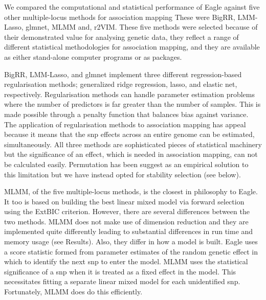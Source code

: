 \documentclass{article}
\begin{document}
We compared the computational and statistical performance of Eagle against five other multiple-locus methods for 
association mapping  These were BigRR, LMM-Lasso, glmnet, MLMM  and, r2VIM. 
These five methods were selected because of their demonstrated value 
for analysing genetic data, they reflect a range of different statistical methodologies for association mapping, and they are available as 
either stand-alone computer programs or as  packages.

BigRR, LMM-Lasso, and glmnet  implement three different regression-based regularisation methods; generalized ridge regression, 
lasso, and elastic net, respectively. Regularisation methods can handle parameter estimation problems where the number of predictors is
 far greater than the number of  samples. This is made possible through a penalty function that balances bias against variance. 
The application of regularisation methods to association mapping has appeal because it means that the snp effects across an 
entire genome can be estimated, simultaneously. 
All three methods are sophisticated pieces of statistical machinery but the significance of an effect, which 
is needed in association mapping,  can not be calculated easily. Permutation has been suggest as an empirical solution to this 
limitation \cite{shen2013novel} 
but we have instead opted for stability selection (see below).

MLMM, of the five multiple-locus methods, is the closest in philosophy to Eagle. It too is based on  building the 
best  linear mixed model via forward selection using the ExtBIC criterion. 
However, there are several differences between the two methods.
 MLMM does not make use of dimension reduction and they are implemented quite differently leading to substantial 
 differences  in run time and memory usage (see Results).  Also, they differ in how a model is built. 
 Eagle uses a score statistic formed from parameter estimates of the random genetic effect in which to identify the next snp to enter 
 the model.  MLMM uses the statistical significance of a snp when it is treated as a fixed effect in the model. 
 This necessitates fitting a separate linear mixed model for each unidentified snp. Fortunately,  MLMM does do this 
 efficiently.
 
\end{document}
